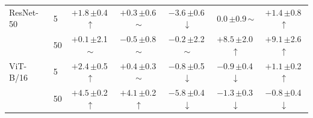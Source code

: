 \begin{table}[htbp]
\begin{tabular}{llccccc}
ResNet-50 & 5 & $+1.8$\,{\scriptsize$\pm$0.4}\,$\uparrow$ & $+0.3$\,{\scriptsize$\pm$0.6}\,$\sim$ & $-3.6$\,{\scriptsize$\pm$0.6}\,$\downarrow$ & $0.0$\,{\scriptsize$\pm$0.9}\,$\sim$ & $+1.4$\,{\scriptsize$\pm$0.8}\,$\uparrow$ \\
 & 50 & $+0.1$\,{\scriptsize$\pm$2.1}\,$\sim$ & $-0.5$\,{\scriptsize$\pm$0.8}\,$\sim$ & $-0.2$\,{\scriptsize$\pm$2.2}\,$\sim$ & $+8.5$\,{\scriptsize$\pm$2.0}\,$\uparrow$ & $+9.1$\,{\scriptsize$\pm$2.6}\,$\uparrow$ \\
\addlinespace[2pt]
ViT-B/16 & 5 & $+2.4$\,{\scriptsize$\pm$0.5}\,$\uparrow$ & $+0.4$\,{\scriptsize$\pm$0.3}\,$\sim$ & $-0.8$\,{\scriptsize$\pm$0.5}\,$\downarrow$ & $-0.9$\,{\scriptsize$\pm$0.4}\,$\downarrow$ & $+1.1$\,{\scriptsize$\pm$0.2}\,$\uparrow$ \\
 & 50 & $+4.5$\,{\scriptsize$\pm$0.2}\,$\uparrow$ & $+4.1$\,{\scriptsize$\pm$0.2}\,$\uparrow$ & $-5.8$\,{\scriptsize$\pm$0.4}\,$\downarrow$ & $-1.3$\,{\scriptsize$\pm$0.3}\,$\downarrow$ & $-0.8$\,{\scriptsize$\pm$0.4}\,$\downarrow$ \\
\bottomrule
\end{tabular}
\end{table}

